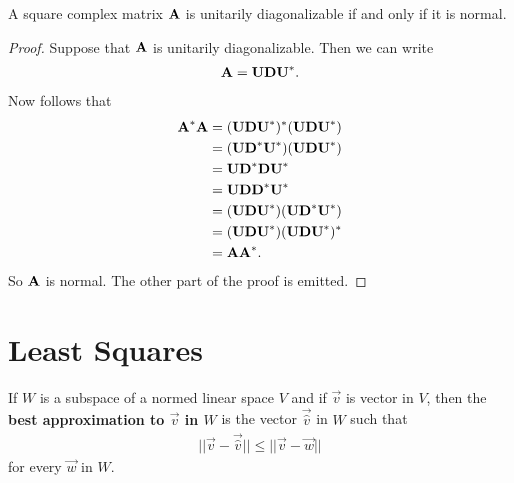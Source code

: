 \documentclass{memoir}
\begin{document}
\begin{theorem}
    A square complex matrix $\mat{A}$ is unitarily diagonalizable if and only if it is normal.
\end{theorem}
\begin{proof}
    Suppose that $\mat{A}$ is unitarily diagonalizable. Then we can write
    \begin{align*}
        \mat{A} = \mat{U} \mat{D} \mat{U}^*.
    \end{align*}
    Now follows that
    \begin{align*}
        \mat{A}^* \mat{A} &= (\mat{U} \mat{D} \mat{U}^*)^* (\mat{U} \mat{D} \mat{U}^*) \\
        &= (\mat{U} \mat{D}^* \mat{U}^*) (\mat{U} \mat{D} \mat{U}^*) \\
        &= \mat{U} \mat{D}^* \mat{D} \mat{U}^* \\
        &= \mat{U} \mat{D} \mat{D}^* \mat{U}^* \\
        &= (\mat{U} \mat{D} \mat{U}^*) (\mat{U} \mat{D}^* \mat{U}^*) \\
        &= (\mat{U} \mat{D} \mat{U}^*) (\mat{U} \mat{D} \mat{U}^*)^* \\
        &= \mat{A} \mat{A}^*.
    \end{align*}
    So $\mat{A}$ is normal. The other part of the proof is emitted.
\end{proof}

\section{Least Squares}
\begin{definition}
    If $W$ is a subspace of a normed linear space $V$ and if $\vec{v}$ is vector in $V$, then the \textbf{best approximation to $\vec{v}$ in $W$} is the vector $\vec{\hat{v}}$ in $W$ such that
    \begin{align*}
        ||\vec{v} - \vec{\hat{v}}|| \le ||\vec{v} - \vec{w}||
    \end{align*}
    for every $\vec{w}$ in $W$.
\end{definition}
\end{document}
